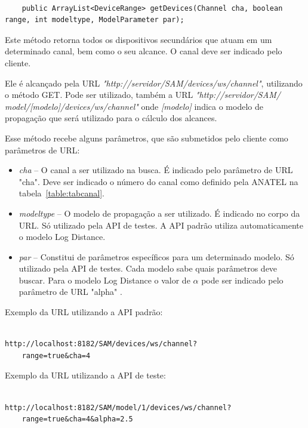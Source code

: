 \begin{lstlisting}

	public ArrayList<DeviceRange> getDevices(Channel cha, boolean range, int modeltype, ModelParameter par);

\end{lstlisting}


Este método retorna todos os dispositivos secundários que atuam em um determinado canal, bem como o seu alcance. O canal deve ser indicado pelo cliente.

Ele é alcançado pela URL \textit{"http://servidor/SAM/devices/ws/channel"}, utilizando o método GET. Pode ser utilizado, também a URL \textit{"http://servidor/SAM/ model/[modelo]/devices/ws/channel"} onde \textit{[modelo]} indica o modelo de propagação que será utilizado para o cálculo dos alcances.

Esse método recebe alguns parâmetros, que são submetidos pelo cliente como parâmetros de URL:

\begin{itemize}
\item \textit{cha} --  O canal a ser utilizado na busca. É indicado pelo parâmetro de URL "cha". Deve ser indicado o número do canal como definido pela ANATEL na tabela~\ref{table:tabcanal}.
\item \textit{modeltype} -- O modelo de propagação a ser utilizado. É indicado no corpo da URL. Só utilizado pela API de testes. A API padrão utiliza automaticamente o modelo Log Distance.
\item \textit{par} -- Constitui de parâmetros específicos para um determinado modelo. Só utilizado pela API de testes. Cada modelo sabe quais parâmetros deve buscar. Para o modelo Log Distance o valor de \begin{math} \alpha \end{math} pode ser indicado pelo parâmetro de URL "alpha" .
\end{itemize}

Exemplo da URL utilizando a API padrão:

\begin{lstlisting}	

http://localhost:8182/SAM/devices/ws/channel?
	range=true&cha=4

\end{lstlisting}

Exemplo da URL utilizando a API de teste:

\begin{lstlisting}			

http://localhost:8182/SAM/model/1/devices/ws/channel?
	range=true&cha=4&alpha=2.5

\end{lstlisting}


